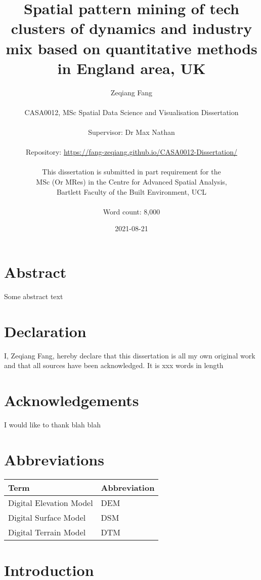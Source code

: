 \documentclass[
  12pt,
  oneside]{book}
\title{Spatial pattern mining of tech clusters of dynamics and industry mix based on quantitative methods in England area, UK}
\author{Zeqiang Fang\\
~\\
CASA0012, MSc Spatial Data Science and Visualisation Dissertation\\
~\\
Supervisor: Dr Max Nathan\\
~\\
Repository: \url{https://fang-zeqiang.github.io/CASA0012-Dissertation/}\\
~\\
This dissertation is submitted in part requirement for the\\
MSc (Or MRes) in the Centre for Advanced Spatial Analysis,\\
Bartlett Faculty of the Built Environment, UCL\\
~\\
Word count: 8,000}
\date{2021-08-21}
\begin{document}
\maketitle


\hypertarget{abstract}{%
\chapter*{Abstract}\label{abstract}}

Some abstract text


\hypertarget{declaration}{%
\chapter*{Declaration}\label{declaration}}

I, Zeqiang Fang, hereby declare that this dissertation is all my own original work and that all sources have been acknowledged. It is xxx words in length

\hypertarget{acknowledgements}{%
\chapter*{Acknowledgements}\label{acknowledgements}}

I would like to thank blah blah

\setcounter{tocdepth}{3}
\tableofcontents
\listoffigures
\listoftables

\hypertarget{abbreviations}{%
\chapter*{Abbreviations}\label{abbreviations}}

\begin{table}
\centering
\begin{tabular}{ll}
\toprule
\textbf{Term} & \textbf{Abbreviation}\\
\midrule
Digital Elevation Model & DEM\\
Digital Surface Model & DSM\\
Digital Terrain Model & DTM\\
\bottomrule
\end{tabular}
\end{table}

\hypertarget{introduction}{%
\chapter{Introduction}\label{introduction}}
\end{document}

